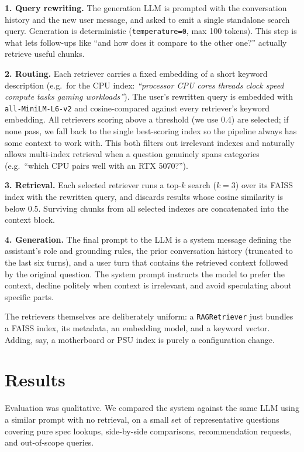 \documentclass[fleqn,moreauthors,10pt]{ds_report}
\begin{document}
\textbf{1. Query rewriting.} The generation LLM is prompted with the conversation history and the new user message, and asked to emit a single standalone search query. Generation is deterministic (\texttt{temperature=0}, max 100 tokens). This step is what lets follow-ups like ``and how does it compare to the other one?'' actually retrieve useful chunks.
 
\textbf{2. Routing.} Each retriever carries a fixed embedding of a short keyword description (e.g.\ for the CPU index: \emph{``processor CPU cores threads clock speed compute tasks gaming workloads''}). The user's rewritten query is embedded with \texttt{all-MiniLM-L6-v2} and cosine-compared against every retriever's keyword embedding. All retrievers scoring above a threshold (we use 0.4) are selected; if none pass, we fall back to the single best-scoring index so the pipeline always has some context to work with. This both filters out irrelevant indexes and naturally allows multi-index retrieval when a question genuinely spans categories (e.g.\ ``which CPU pairs well with an RTX 5070?'').
 
\textbf{3. Retrieval.} Each selected retriever runs a top-$k$ search ($k\!=\!3$) over its FAISS index with the rewritten query, and discards results whose cosine similarity is below 0.5. Surviving chunks from all selected indexes are concatenated into the context block.
 
\textbf{4. Generation.} The final prompt to the LLM is a system message defining the assistant's role and grounding rules, the prior conversation history (truncated to the last six turns), and a user turn that contains the retrieved context followed by the original question. The system prompt instructs the model to prefer the context, decline politely when context is irrelevant, and avoid speculating about specific parts.
 
The retrievers themselves are deliberately uniform: a \texttt{RAGRetriever} just bundles a FAISS index, its metadata, an embedding model, and a keyword vector. Adding, say, a motherboard or PSU index is purely a configuration change.


\section*{Results}
 
Evaluation was qualitative. We compared the system against the same LLM using a similar prompt with no retrieval, on a small set of representative questions covering pure spec lookups, side-by-side comparisons, recommendation requests, and out-of-scope queries.
 
\end{document}
